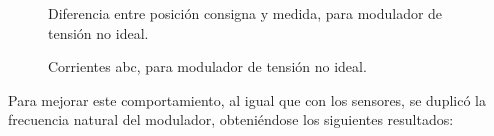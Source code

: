 \documentclass[a4paper, 10pt, onecolumn,journal]{ieeeconf}
\begin{document}
\begin{figure}[H]
	\centering
	\begin{adjustbox}{scale=0.52,max width=\columnwidth}
	\end{adjustbox}
	\caption{Diferencia entre posición consigna y medida, para modulador de tensión no ideal.}
	\label{Diferencia entre posición consigna y medida, para modulador de tensión no ideal}
\end{figure}

\begin{figure}[H]
	\centering
	\begin{adjustbox}{scale=0.52,max width=\columnwidth}
	\end{adjustbox}
	\caption{Corrientes abc, para modulador de tensión no ideal.}
	\label{Corrientes abc, para modulador de tensión no ideal}
\end{figure}
Para mejorar este comportamiento, al igual que con los sensores, se duplicó la frecuencia natural del modulador, obteniéndose los siguientes resultados:
\end{document}
